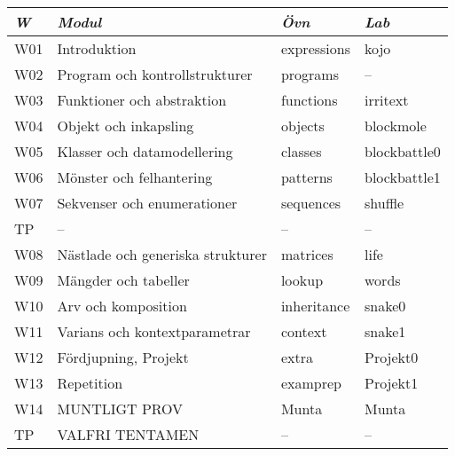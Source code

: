 \begin{tabular}{l|l|l|l}
\textit{W} & \textit{Modul} & \textit{Övn} & \textit{Lab} \\ \hline \hline
W01 & Introduktion & expressions & kojo \\
W02 & Program och kontrollstrukturer & programs & -- \\
W03 & Funktioner och abstraktion & functions & irritext \\
W04 & Objekt och inkapsling & objects & blockmole \\
W05 & Klasser och datamodellering & classes & blockbattle0 \\
W06 & Mönster och felhantering & patterns & blockbattle1 \\
W07 & Sekvenser och enumerationer & sequences & shuffle \\
TP & -- & -- & -- \\
W08 & Nästlade och generiska strukturer & matrices & life \\
W09 & Mängder och tabeller & lookup & words \\
W10 & Arv och komposition & inheritance & snake0 \\
W11 & Varians och kontextparametrar & context & snake1 \\
W12 & Fördjupning, Projekt & extra & Projekt0 \\
W13 & Repetition & examprep & Projekt1 \\
W14 & MUNTLIGT PROV & Munta & Munta \\
TP & VALFRI TENTAMEN & -- & -- \\
\end{tabular}
